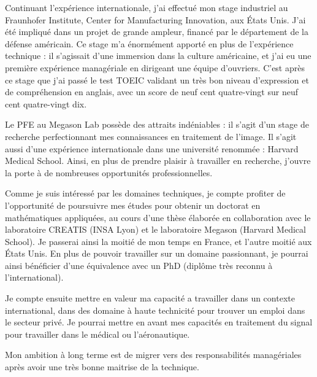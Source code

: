 Continuant l'expérience internationale, j'ai effectué mon stage industriel au
Fraunhofer Institute, Center for Manufacturing Innovation, aux États Unis.
J'ai été impliqué dans un projet de grande ampleur, financé par le département de la défense américain.
Ce stage m'a énormément apporté en plus de l'expérience technique : il s'agissait d'une immersion dans la culture américaine, et j'ai eu une première expérience managériale en dirigeant une équipe d'ouvriers.
C'est après ce stage que j'ai passé le test TOEIC validant un très bon niveau d'expression et de compréhension en anglais,
avec un score de neuf cent quatre-vingt sur neuf cent quatre-vingt dix.


Le PFE au Megason Lab possède des attraits indéniables :
il s'agit d'un stage de recherche perfectionnant mes connaissances en traitement de l'image.
Il s'agit aussi d'une expérience internationale dans une université renommée : Harvard Medical School.
Ainsi, en plus de prendre plaisir à travailler en recherche, j'ouvre la porte à de nombreuses opportunités professionnelles.

Comme je suis intéressé par les domaines techniques,
je compte profiter de l'opportunité de poursuivre mes études pour obtenir un doctorat en mathématiques appliquées,
au cours d'une thèse élaborée en collaboration avec le laboratoire CREATIS (INSA Lyon)
et le laboratoire Megason (Harvard Medical School).
Je passerai ainsi la moitié de mon temps en France, et l'autre moitié aux États Unis.
En plus de pouvoir travailler sur un domaine passionnant,
je pourrai ainsi bénéficier d'une équivalence avec un PhD (diplôme très reconnu à l'international). 

Je compte ensuite mettre en valeur ma capacité a travailler dans un contexte international,
dans des domaine à haute technicité pour trouver un emploi  dans le secteur privé.
Je pourrai mettre en avant mes capacités en traitement du signal pour travailler dans le médical ou l'aéronautique.

Mon ambition à long terme est de migrer vers des responsabilités managériales après avoir une très bonne maitrise de la technique.




\appendix







